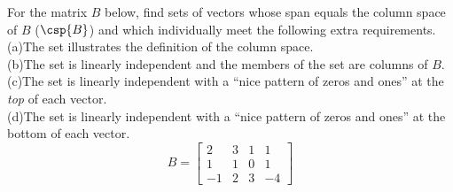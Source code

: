 For the matrix $B$ below, find sets of vectors whose span equals the column space of $B$ ($\csp{B}$) and which individually meet the following extra requirements.\\
(a)\quad  The set illustrates the definition of the column space.\\
(b)\quad The set is linearly independent and the members of the set are columns of $B$.\\
(c)\quad The set is linearly independent with a ``nice pattern of zeros and ones'' at the {\em top} of each vector.\\
(d)\quad The set is linearly independent with a ``nice pattern of zeros and ones'' at the bottom of each vector.
%
\begin{equation*}
B=
\begin{bmatrix}
2 & 3 & 1 & 1\\
1 & 1 & 0 & 1\\
-1 & 2 & 3 & -4
\end{bmatrix}
\end{equation*}
